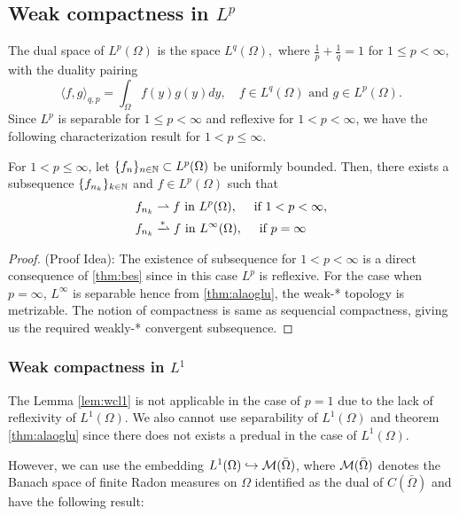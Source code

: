 \subsection{Weak compactness in \texorpdfstring{$L^p$}{L\^p}}
The dual space of $L^p(\Omega)$ is the space $L^q(\Omega),$ where $\frac{1}{p} + \frac{1}{q} = 1$ for $1 \leq p < \infty$, with the duality pairing
$$ \langle f,g\rangle_{q,p} = \int_{\Omega} f(y)g(y) dy, \quad f\in L^q(\Omega) \text{ and } g\in L^p(\Omega).$$
Since $L^p$ is separable for $1 \leq p <\infty$ and reflexive for $1 < p < \infty$, we have the following characterization result for $1 < p \leq \infty$.

\begin{lem}\label{lem:wcl1}
    For $1 < p \leq \infty$, let $\{f_n\}_{n \in \mathbb{N}} \subset L^p(\Omega)$ be uniformly bounded. Then, there exists a subsequence $\{f_{n_k}\}_{k \in \mathbb{N}}$ and $f\in L^p(\Omega)$ such that 
    \begin{align*}
        &f_{n_k} \rightharpoonup f \text{ in } L^p(\Omega), \quad \text{ if } 1 < p < \infty, \\
        &f_{n_k} \xrightharpoonup{*} f \text{ in } L^\infty(\Omega), \quad \text{ if } p = \infty
    \end{align*}
\end{lem}
\begin{proof}
    (Proof Idea): The existence of subsequence for $1 < p < \infty$ is a direct consequence of \ref{thm:bes} since in this case $L^p$ is reflexive. For the case when $p=\infty$, $L^\infty$ is separable hence from \ref{thm:alaoglu}, the weak-* topology is metrizable. The notion of compactness is same as sequencial compactness, giving us the required weakly-* convergent subsequence. 
\end{proof}

\subsubsection*{Weak compactness in \texorpdfstring{$L^1$}{L^1}}
The Lemma \ref{lem:wcl1} is not applicable in the case of $p=1$ due to the lack of reflexivity of $L^1(\Omega)$. We also cannot use separability of $L^1(\Omega)$ and theorem \ref{thm:alaoglu} since there does not exists a predual in the case of $L^1(\Omega)$.

However, we can use the embedding $L^1(\Omega) \hookrightarrow {\cal M}(\bar{\Omega})$, where ${\cal M}(\bar{\Omega})$ denotes the Banach space of finite Radon measures on $\Omega$ identified as the dual of $C(\bar{\Omega})$ and have the following result:

